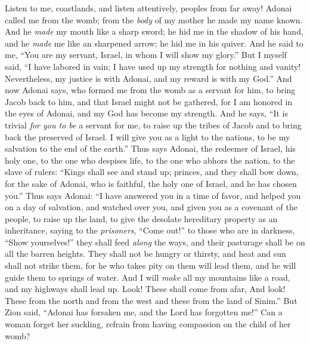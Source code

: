 \begin{biblechapter} %
 Listen to me, coastlands, 
and listen attentively, peoples from far away! 
Adonai called me from the womb; 
from the \textit{body} of my mother he made my name known.
\verse And he \textit{made} my mouth like a sharp sword; 
he hid me in the shadow of his hand, 
and he \textit{made} me like an sharpened arrow; 
he hid me in his quiver.
\verse And he said to me, “You are my servant, 
Israel, in whom I will show my glory.”
\verse But I myself said, “I have labored in vain; 
I have used up my strength for nothing and vanity! 
Nevertheless, my justice is with Adonai, 
and my reward is with my God.”
\verse And now Adonai says, 
who formed me from the womb as a servant for him, 
to bring Jacob back to him, 
and that Israel might not be gathered, 
for I am honored in the eyes of Adonai, 
and my God has become my strength.
\verse And he says, “It is trivial \textit{for you to be} a servant for me, to raise up the tribes of Jacob 
and to bring back the preserved of Israel. 
I will give you as a light to the nations, 
to be my salvation to the end of the earth.”
\verse Thus says Adonai, the redeemer of Israel, his holy one, to the one who despises life, 
to the one who abhors the nation, 
to the slave of rulers: 
“Kings shall see and stand up; 
princes, and they shall bow down, 
for the sake of Adonai, who is faithful, 
the holy one of Israel, and he has chosen you.”
 Thus says Adonai:
\verse “I have answered you in a time of favor, 
and helped you on a day of salvation, 
and watched over you, 
and given you as a covenant of the people, 
to raise up the land, 
to give the desolate hereditary property as an inheritance,
\verse saying to the \textit{prisoners}, “Come out!” 
to those who are in darkness, “Show yourselves!” 
they shall feed \textit{along} the ways, 
and their pasturage shall be on all the barren heights.
\verse They shall not be hungry or thirsty, 
and heat and sun shall not strike them, 
for he who takes pity on them will lead them, 
and he will guide them to springs of water.
\verse And I will \textit{make} all my mountains like a road, 
and my highways shall lead up.
\verse Look! These shall come from afar, 
And look! These from the north and from the west 
and these from the land of Sinim.”
 But Zion said, “Adonai has forsaken me, 
and the Lord has forgotten me!”
\verse Can a woman forget her suckling, 
refrain from having compassion on the child of her womb? 

\end{biblechapter}
